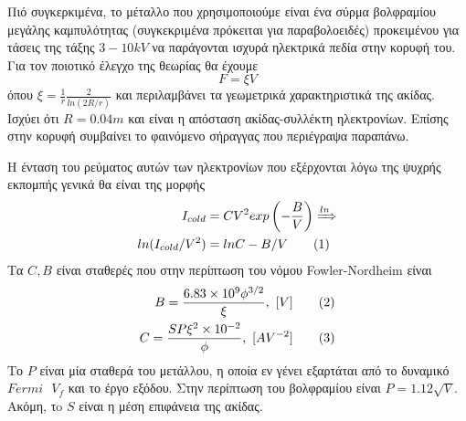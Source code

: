 \documentclass[a4paper]{article}
\newcommand\numberthis{\addtocounter{equation}{1}\tag{\theequation}}
\begin{document}

Πιό συγκερκιμένα, το μέταλλο που χρησιμοποιούμε είναι ένα σύρμα βολφραμίου μεγάλης καμπυλότητας (συγκεκριμένα πρόκειται για παραβολοειδές) προκειμένου για τάσεις της τάξης $3-10kV$ να παράγονται ισχυρά ηλεκτρικά πεδία στην κορυφή του. Για τον ποιοτικό έλεγχο της θεωρίας θα έχουμε 
\begin{equation}\label{12}
F=\xi V
\end{equation}
όπου  $\xi=\frac{1}{r}\frac{2}{ln(2R/r)}$ και περιλαμβάνει τα γεωμετρικά χαρακτηριστικά της ακίδας. Ισχύει ότι $R=0.04m$ και είναι η απόσταση ακίδας-συλλέκτη ηλεκτρονίων.
Επίσης στην κορυφή συμβαίνει το φαινόμενο σήραγγας που περιέγραψα παραπάνω.


Η ένταση του ρεύματος αυτών των ηλεκτρονίων που εξέρχονται λόγω της ψυχρής εκπομπής γενικά θα είναι της μορφής 
\begin{align*}\label{13}
I_{cold}&=CV^2exp\left(-\frac{B}{V}\right) \xRightarrow{ln} \\ 
ln(I_{cold}/V^2)&=lnC-B/V \numberthis
\end{align*}
Τα $C,B$ είναι σταθερές που στην περίπτωση του νόμου Fowler-Nordheim είναι
\begin{align*}\label{14}
B=\frac{6.83\times10^9\phi^{3/2}}{\xi}, \text{       }[V]          \numberthis      \\
C=\frac{SP\xi^2\times10^{-2}}{\phi},\text{         }[AV^{-2}]      \numberthis
\end{align*}
Το $P$ είναι μία σταθερά του μετάλλου, η οποία εν γένει εξαρτάται από το δυναμικό $Fermi \text{ } V_f$ και το έργο εξόδου. Στην περίπτωση του βολφραμίου είναι $P=1.12\sqrt{V}$. Ακόμη, τo $S$ είναι η μέση επιφάνεια της ακίδας.
\end{document}
